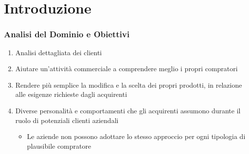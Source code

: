 \section{Introduzione}%
\begin{frame}[fragile]
    \frametitle{Analisi del Dominio e Obiettivi}
    \begin{enumerate}
        \item Analisi dettagliata dei clienti
        \item Aiutare un'attività commerciale a comprendere meglio i propri compratori
        \item Rendere più semplice la modifica e la scelta dei propri prodotti, in relazione alle esigenze richieste dagli acquirenti
        \item Diverse personalità e comportamenti che gli acquirenti assumono durante il ruolo di potenziali clienti aziendali
        \begin{itemize}
            \item Le aziende non possono adottare lo stesso approccio per ogni tipologia di plausibile compratore
        \end{itemize}
       
        
    \end{enumerate}
\end{frame}
